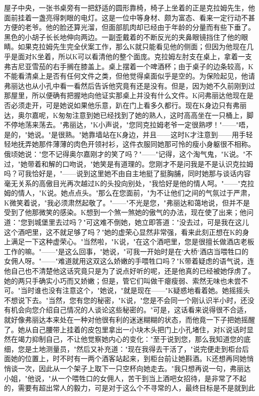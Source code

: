 \documentclass[12pt,a4paper]{article}
\begin{document}
屋子中央，一张书桌旁有一把舒适的圆形靠椅，椅子上坐着的正是克拉姆先生，他面前挂着一盏亮得刺眼的电灯。这是一位中等身材、颇为富态、看来一定行动不甚方便的老爷。他的脸还算光溜，但面部肌肉却已经由于年龄的分量而有些下垂了。黑色的小胡子长长地伸向两边。一副歪戴着的不断反光的夹鼻眼镜挡住了他的眼睛。如果克拉姆先生完全伏案工作，那么K就只能看见他的侧面；但因为他现在几乎是面对K坐着，所以K可以看清他的整个面庞。克拉姆左肘支在桌上，拿着一支弗吉尼亚雪茄的右手搁在膝盖上。桌上摆着一个啤酒杯；由于桌子的边条较高，K不能看清桌上是否有任何文件之类，但他觉得桌面似乎是空的。为保险起见，他请弗丽达也从小孔中看一看然后告诉他究竟有还是没有。但是，因为她不久前刚到过那屋里，所以便确有把握地向他证实那桌上并没有什么文件。K问弗丽达他现在是否必须走开，可是她说如果他乐意，趴在门上看多久都行。现在K身边只有弗丽达，奥尔嘉呢，K匆匆注意到她已经找到了她的熟人，这时高高坐在一只桶上，脚不停地荡来荡去。"弗丽达，"K小声说，"您同克拉姆老爷一定很熟啰！"——"唔，是的，"她说。"是很熟。"她靠墙站在K身边，并且——这时K才注意到——用手轻轻地抚弄她那件薄薄的肉色开领衬衫，这件衣服同她那可怜的瘦小身躯很不相称。俄顷她说："您不记得奥尔嘉刚才的笑了吗？"——"记得，这个淘气鬼，"K说。"不过，"她带着和解的口吻说，"她笑是有道理的。您刚才不是问我是不是认识克拉姆吗？可我恰好是，"——说到这里她不由自主地挺了挺胸脯，同时她那与谈话内容毫无关系的高傲目光再次越过K的头投向别处，"我恰好是他的情人呵。"——"克拉姆的情人，"K说。她点点头。"那么在您面前，"为不让他们之间的气氛过于严肃，K微笑着说，"我必须肃然起敬了。"——"不光是您，"弗丽达和蔼地说，但并不是受到了他那微笑的感染。K想到一个煞一煞她的傲气的办法，现在使了出来；他问道："您到城堡里去过吗？"可这难不倒她，她立即答道："没去过，可是我在这儿这个酒吧里，这不就足够了吗？"她的虚荣心显然非常强，看来此刻正想在K的身上满足一下这种虚荣心。"当然啦，"K说，"在这个酒吧里，您是很擅长做酒店老板工作的嘛。"——"是这么回事，"她说，"可我一开始时是在‘大桥‘酒店当喂牲口的女佣人呀。"——"难道就用这双这么娇嫩的手喂牲口吗？"K带着疑虑的语气说，连他自己也不清楚他这话究竟只是为了说点好听的呢，还是他真的已经被她俘虏了。她的两只手确实小巧而又娇嫩；但是，管它们叫做干瘪瘦弱、索然无味也未尝不可。"当时谁也没有注意这个，"她说，"就是现在——"K疑惑地看着她。她摇摇头不想说下去。"当然，您有您的秘密，"K说，"您是不会同一个刚认识半小时，还没有机会向您介绍自己情况的人谈论这些秘密的。"可是，这话看来说得很不合适，就好像弗丽达本来处在一种对他很有利的迷迷糊糊的状态，而他竟一下子把她摇醒了。她从自己腰带上挂着的皮包里拿出一小块木头把门上小孔堵住，对K说话时显然在竭力抑制自己，不让他觉察她内心的变化："至于说到您，那么我知道您的底细，您是土地测量员，"然后又补充道："现在我得去干活了，"说完便走到柜台后面她的位置上，时不时有一两个酒客站起来，到柜台前让她斟酒。K还想再同她悄悄谈一次，因此从一个架子上取下一只空杯向她走去。"我只想再说一句，弗丽达小姐，"他说，"从一个喂牲口的女佣人，苦干到当上酒吧女招待，是非常了不起的，需要有超出常人的毅力，可是对于这么个不寻常的人，最终目标是不是就到此
\end{document}
